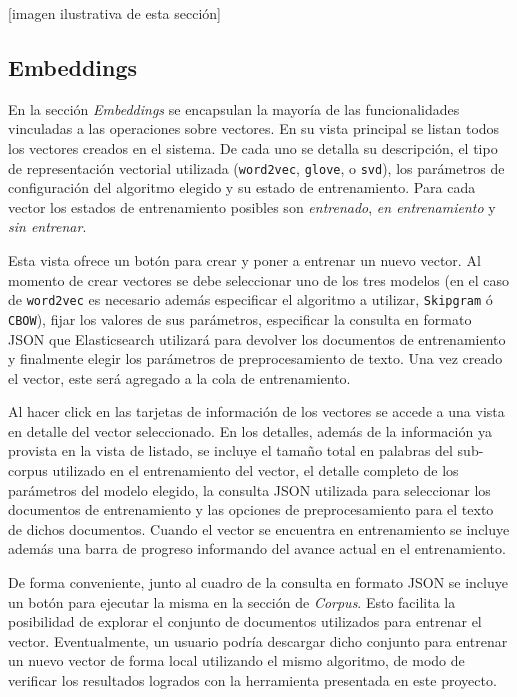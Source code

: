 [imagen ilustrativa de esta sección]

\subsection{Embeddings}

En la sección \textit{Embeddings} se encapsulan la mayoría de las funcionalidades vinculadas a las
operaciones sobre vectores. En su vista principal se listan todos los vectores creados en el sistema.
De cada uno se detalla su descripción, el tipo de representación vectorial utilizada (\texttt{word2vec},
\texttt{glove}, o \texttt{svd}), los parámetros de configuración del algoritmo elegido y su estado de
entrenamiento. Para cada vector los estados de entrenamiento posibles son \textit{entrenado},
\textit{en entrenamiento} y \textit{sin entrenar}.

Esta vista ofrece un botón para crear y poner a entrenar un nuevo vector. Al momento de crear vectores se
debe seleccionar uno de los tres modelos (en el caso de \texttt{word2vec} es necesario además especificar
el algoritmo a utilizar, \texttt{Skipgram} ó \texttt{CBOW}), fijar los valores de sus parámetros,
especificar la consulta en formato JSON que Elasticsearch utilizará para devolver los documentos de
entrenamiento y finalmente elegir los parámetros de preprocesamiento de texto. Una vez creado el vector,
este será agregado a la cola de entrenamiento.

Al hacer click en las tarjetas de información de los vectores se accede a una vista en detalle del vector
seleccionado. En los detalles, además de la información ya provista en la vista de listado, se incluye el
tamaño total en palabras del sub-corpus utilizado en el entrenamiento del vector, el detalle completo de
los parámetros del modelo elegido, la consulta JSON utilizada para seleccionar los documentos de
entrenamiento y las opciones de preprocesamiento para el texto de dichos documentos. Cuando el vector se
encuentra en entrenamiento se incluye además una barra de progreso informando del avance actual en el
entrenamiento.

De forma conveniente, junto al cuadro de la consulta en formato JSON se incluye un botón para ejecutar la
misma en la sección de \textit{Corpus}. Esto facilita la posibilidad de explorar el conjunto de documentos
utilizados para entrenar el vector. Eventualmente, un usuario podría descargar dicho conjunto para entrenar
un nuevo vector de forma local utilizando el mismo algoritmo, de modo de verificar los resultados logrados
con la herramienta presentada en este proyecto.

